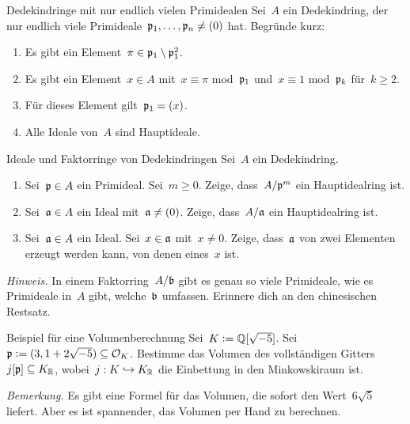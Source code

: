 \documentclass{uebblatt}
\begin{document}

\begin{aufgabe}{Dedekindringe mit nur endlich vielen Primidealen}
Sei~$A$ ein Dedekindring, der nur endlich viele
Primideale~$\mathfrak{p}_1,\ldots,\mathfrak{p}_n \neq (0)$ hat. Begründe kurz:
\begin{enumerate}
\item Es gibt ein Element~$\pi \in \mathfrak{p}_1 \setminus \mathfrak{p}_1^2$.
\item Es gibt ein Element~$x \in A$ mit~$x \equiv \pi$
mod~$\mathfrak{p}_1$ und~$x \equiv 1$ mod~$\mathfrak{p}_k$ für~$k \geq 2$.
\item Für dieses Element gilt~$\mathfrak{p}_1 = (x)$.
\item Alle Ideale von~$A$ sind Hauptideale.
\end{enumerate}
\end{aufgabe}

\begin{aufgabe}{Ideale und Faktorringe von Dedekindringen}
Sei~$A$ ein Dedekindring.
\begin{enumerate}
\item Sei~$\mathfrak{p} \in A$ ein Primideal. Sei~$m \geq 0$. Zeige, dass~$A/\mathfrak{p}^m$ ein Hauptidealring
ist.
\item Sei~$\mathfrak{a} \in A$ ein Ideal mit~$\mathfrak{a} \neq (0)$. Zeige, dass~$A/\mathfrak{a}$ ein
Hauptidealring ist.
\item Sei~$\mathfrak{a} \in A$ ein Ideal. Sei~$x \in \mathfrak{a}$ mit~$x \neq 0$. Zeige,
dass~$\mathfrak{a}$ von zwei Elementen erzeugt werden kann, von denen eines~$x$ ist.
\end{enumerate}
{\tiny\emph{Hinweis.} In einem Faktorring~$A/\mathfrak{b}$ gibt es genau so viele
Primideale, wie es Primideale in~$A$ gibt, welche~$\mathfrak{b}$ umfassen. Erinnere
dich an den chinesischen Restsatz.\par}
\end{aufgabe}

\begin{aufgabe}{Beispiel für eine Volumenberechnung}
Sei~$K \vcentcolon= \mathbb{Q}[\sqrt{-5}]$. Sei~$\mathfrak{p} \vcentcolon= (3, 1 + 2\sqrt{-5}) \subseteq
\mathcal{O}_K$. Bestimme das Volumen des vollständigen
Gitters~$j[\mathfrak{p}] \subseteq K_{\mathbb{R}}$, wobei~$j : K \hookrightarrow K_{\mathbb{R}}$ die
Einbettung in den Minkowskiraum ist.

{\tiny\emph{Bemerkung.} Es gibt eine Formel für das Volumen, die sofort den
Wert~$6 \sqrt{5}$ liefert. Aber es ist spannender, das Volumen per Hand zu
berechnen.\par}
\end{aufgabe}
\end{document}
